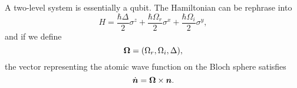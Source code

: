 \documentclass[hyperref, a4paper]{article}
\begin{document}
A two-level system is essentially a qubit. The Hamiltonian can be rephrase into 
\begin{equation}
    H = \frac{\hbar \Delta}{2} \sigma^z + \frac{\hbar \Omega_r}{2} \sigma^x + \frac{\hbar \Omega_i}{2} \sigma^y, 
\end{equation}
and if we define 
\begin{equation}
    \vb*{\Omega} = (\Omega_r, \Omega_i, \Delta),
\end{equation}
the vector representing the atomic wave function on the Bloch sphere satisfies 
\begin{equation}
    \dot{\vb*{n}} = \vb*{\Omega} \times \vb*{n}.
\end{equation}
\end{document}
